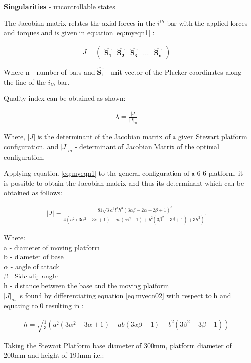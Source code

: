 \textbf{Singularities} - uncontrollable states.

The Jacobian matrix relates the axial forces in the $i^{th}$ bar with the applied
forces and torques and is given in equation \eqref{eq:myeqn1} \cite{fernandes_design_nodate}:

\begin{ceqn}
	\begin{align}
		J =
		\begin{pmatrix}
		\hat{\boldsymbol{S_{1}}} & \hat{\boldsymbol{S_{2}}} & \hat{\boldsymbol{S_{3}}} & ... & \hat{\boldsymbol{S_{n}}}
		\end{pmatrix}
		\label{eq:myeqn1}
	\end{align}
\end{ceqn}

Where n - number of bars and $ \hat{\boldsymbol{S_{i}}}$ - unit vector of the Plucker coordinates along the line of the
$i_{th}$ bar.

Quality index can be obtained as shown:
\begin{ceqn}
	\begin{align}
		\lambda = \frac{|J|}{|J|_{m}}
		\label{eq:myeqn}			
	\end{align}
\end{ceqn}
Where, $|J|$ is the determinant of the Jacobian matrix of a given Stewart platform configuration, and $ |J|_{m} $ - determinant of Jacobian Matrix of the optimal configuration.

Applying equation \eqref{eq:myeqn1} to the general configuration of a 6-6 platform, it is
possible to obtain the Jacobian matrix and thus its determinant which can be obtained as follows:
\begin{ceqn}
	\begin{align}
		|J| =
\frac{81 \sqrt{3} a^3 b^3 h^3 (3 \alpha \beta - 2 \alpha - 2 \beta +1)^3}{4(a^2(3 \alpha^2 - 3 \alpha + 1)+ ab(\alpha \beta - 1 )+ b^2(3 \beta^2 - 3 \beta + 1)+ 3h^2)^3}
\label{eq:myeqn02}
	\end{align}
\end{ceqn}
Where:\\
a - diameter of moving platform\\
b - diameter of base\\
$\alpha$ - angle of attack\\
$ \beta $ - Side slip angle\\
h - distance between the base and the moving platform\\

$|J|_{m}$ is found by differentiating equation \eqref{eq:myeqn02} with respect to h and equating to 0 resulting in \cite{fernandes_design_nodate}:
\begin{ceqn}
\begin{align}
	h = \sqrt{\frac{1}{3}(a^2 (3 \alpha^2 - 3 \alpha + 1)+ ab (3\alpha\beta - 1)+b^2(3 \beta^2 - 3 \beta + 1))}
	\label{eq:myeqn}
\end{align}
\end{ceqn}
Taking the Stewart Platform base diameter of 300mm, platform diameter of 200mm and height of 190mm i.e.: 

